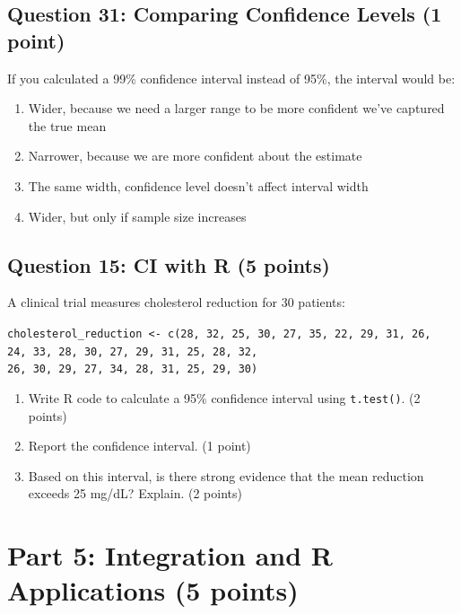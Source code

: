 \documentclass[11pt]{article}
\begin{document}
\vspace{0.5cm}

\subsection*{Question 31: Comparing Confidence Levels (1 point)}

If you calculated a 99\% confidence interval instead of 95\%, the interval would be:

\begin{enumerate}[label=\Alph*)]
\item Wider, because we need a larger range to be more confident we've captured the true mean
\item Narrower, because we are more confident about the estimate
\item The same width, confidence level doesn't affect interval width
\item Wider, but only if sample size increases
\end{enumerate}

\vspace{0.5cm}

\subsection*{Question 15: CI with R (5 points)}

A clinical trial measures cholesterol reduction for 30 patients:

\texttt{cholesterol\_reduction <- c(28, 32, 25, 30, 27, 35, 22, 29, 31, 26,}\\
\texttt{24, 33, 28, 30, 27, 29, 31, 25, 28, 32,}\\
\texttt{26, 30, 29, 27, 34, 28, 31, 25, 29, 30)}

\begin{enumerate}[label=\alph*)]
\item Write R code to calculate a 95\% confidence interval using \texttt{t.test()}. (2 points)
\item Report the confidence interval. (1 point)
\item Based on this interval, is there strong evidence that the mean reduction exceeds 25 mg/dL? Explain. (2 points)
\end{enumerate}

\vspace{1.5cm}

\section{Part 5: Integration and R Applications (5 points)}
\end{document}
